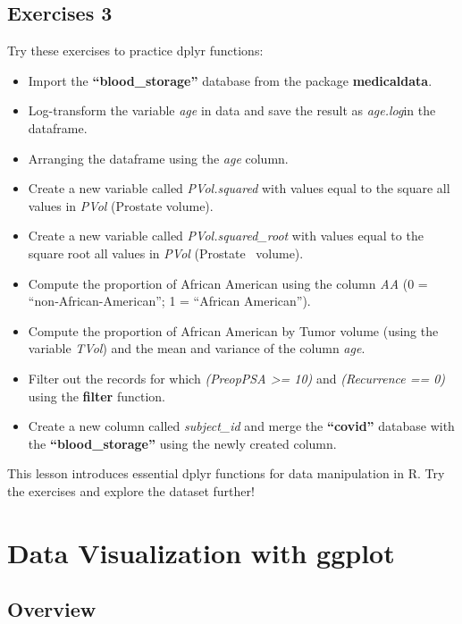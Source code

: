 \documentclass[
]{book}
\begin{document}
\section{Exercises 3}\label{exercises-3}

Try these exercises to practice dplyr functions:

\begin{itemize}
\item
  Import the \textbf{``blood\_storage''} database from the package \textbf{medicaldata}.
\item
  Log-transform the variable \emph{age} in data and save the result as \emph{age.log}in the dataframe.
\item
  Arranging the dataframe using the \emph{age} column.
\item
  Create a new variable called \emph{PVol.squared} with values equal to the square all values in \emph{PVol} (Prostate volume).
  ~
\item
  Create a new variable called \emph{PVol.squared\_root} with values equal to the square root all values in \emph{PVol} (Prostate
  ~volume).
  ~
\item
  Compute the proportion of African American using the column \emph{AA} (0 = ``non‐African-American''; 1 = ``African American'').
\item
  Compute the proportion of African American by Tumor volume (using the variable \emph{TVol}) and the mean and variance of the column \emph{age}.
\item
  Filter out the records for which \emph{(PreopPSA \textgreater= 10)} and \emph{(Recurrence == 0)} using the \textbf{filter} function.
\item
  Create a new column called \emph{subject\_id} and merge the \textbf{``covid''} database with the \textbf{``blood\_storage''} using the newly created column.
\end{itemize}

This lesson introduces essential dplyr functions for data manipulation in R. Try the exercises and explore the dataset further! 🚀

\chapter{Data Visualization with ggplot}\label{data-visualization-with-ggplot}

\section{Overview}\label{overview}
\end{document}
